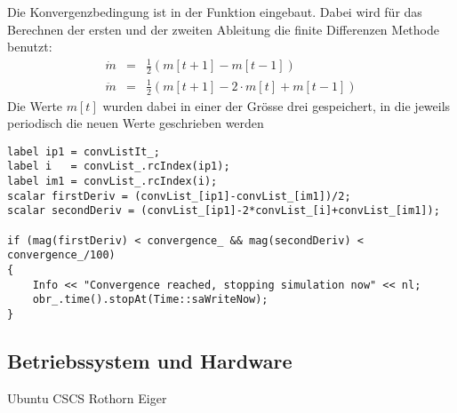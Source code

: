 Die Konvergenzbedingung ist in der Funktion  eingebaut.
Dabei wird für das Berechnen der ersten und der zweiten Ableitung die finite Differenzen Methode benutzt:
%
\begin{eqnarray}
    \label{eq:torqueCalc:fd}
    \dot{m} & = & \frac{1}{2}\left(  m[t+1] - m[t-1] \right) \\
    \ddot{m} & = & \frac{1}{2}\left(  m[t+1] - 2 \cdot m[t] + m[t-1] \right) 
\end{eqnarray}
%
Die Werte $m[t]$ wurden dabei in einer  der Grösse drei gespeichert, in die jeweils periodisch die neuen Werte geschrieben werden
%
\begin{lstlisting}
label ip1 = convListIt_;
label i   = convList_.rcIndex(ip1);
label im1 = convList_.rcIndex(i);
scalar firstDeriv = (convList_[ip1]-convList_[im1])/2;
scalar secondDeriv = (convList_[ip1]-2*convList_[i]+convList_[im1]);

if (mag(firstDeriv) < convergence_ && mag(secondDeriv) < convergence_/100)
{
    Info << "Convergence reached, stopping simulation now" << nl;
    obr_.time().stopAt(Time::saWriteNow);
}
\end{lstlisting}
%
%

%
\subsection{Betriebssystem und Hardware}
\label{Kapitel:Hardware}
\begin{todocontent}
    \1 Ubuntu
    \1 CSCS
    \1 Rothorn
    \1 Eiger
\end{todocontent}
